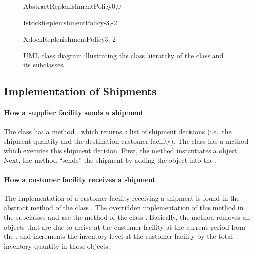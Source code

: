 \begin{figure}[h!]
\centering
\begin{myuml}
  \begin{abstractclass}{AbstractReplenishmentPolicy}{0,0}
  \end{abstractclass}

  \begin{class}{IstockReplenishmentPolicy}{-3,-2}
  \end{class}

  \begin{class}{XdockReplenishmentPolicy}{3,-2}
  \end{class}
\end{myuml}
\caption{UML class diagram illustrating the class hierarchy of 
the \protect{} class
and its subclasses.}
\label{figure:scs->computer-model->uml->replenishment-policy-hierarchy}
\end{figure}





\subsection{Implementation of Shipments}

\paragraph{How a supplier facility sends a shipment}
The class 
has a method ,
which returns a list of shipment decisions
(i.e.\ the shipment quantity and the destination customer facility).
The class 
has a method 
which executes this shipment decision.
First, the method instantiates a  object.
Next, the method ``sends'' the shipment
by adding the  object into the .

\paragraph{How a customer facility receives a shipment}
The implementation of a customer facility receiving a shipment
is found in the abstract method 
of the class .
The overridden implementation of this method
in the subclasses  and 
use the method 
of the class .
Basically, the method removes all  objects
that are due to arrive at the customer facility at the current period
from the ,
and increments the inventory level at the customer facility
by the total inventory quantity in those  objects.





